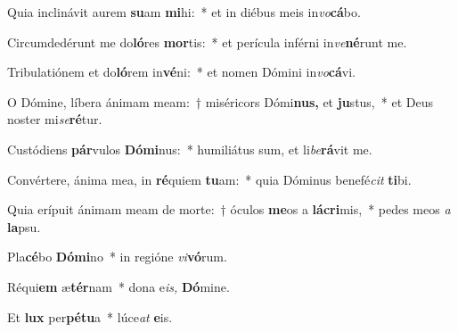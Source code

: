 \item Quia inclinávit aurem \textbf{su}am \textbf{mi}hi:~* et in diébus meis in\textit{vo}\textbf{cá}bo.
\item Circumdedérunt me do\textbf{ló}res \textbf{mor}tis:~* et perícula inférni in\textit{ve}\textbf{né}runt me.
\item Tribulatiónem et do\textbf{ló}rem in\textbf{vé}ni:~* et nomen Dómini in\textit{vo}\textbf{cá}vi.
\item O Dómine, líbera ánimam meam:~† miséricors Dómi\textbf{nus,} et \textbf{ju}stus,~* et Deus noster mi\tinyhspace\textit{se}\textbf{ré}tur.
\item Custódiens \textbf{pár}vulos \textbf{Dó}\textbf{mi}nus:~* humiliátus sum, et li\textit{be}\textbf{rá}vit me.
\item Convértere, ánima mea, in \textbf{ré}quiem \textbf{tu}am:~* quia Dóminus benefé\tinyhspace\textit{cit} \textbf{ti}bi.
\item Quia erípuit ánimam meam de morte:~† óculos \textbf{me}os a \textbf{lá}\textbf{cri}mis,~* pedes meos \textit{a} \textbf{la}psu.
\item Pla\textbf{cé}bo \textbf{Dó}\textbf{mi}no~* in regióne \textit{vi}\textbf{vó}rum.
\item Réqui\textbf{em} æ\textbf{tér}nam~* dona e\textit{is,} \textbf{Dó}mine.
\item Et \textbf{lux} per\textbf{pé}\textbf{tu}a~* lúce\tinyhspace\textit{at} \textbf{e}is.